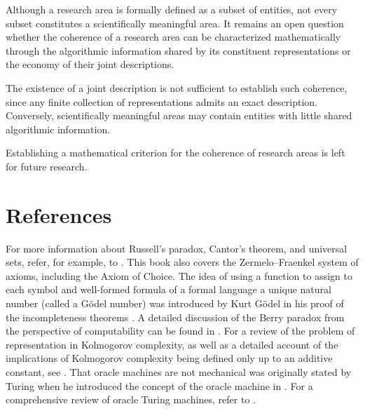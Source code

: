 \begin{remark}
Although a research area is formally defined as a subset of entities, not every subset constitutes a scientifically meaningful area. It remains an open question whether the coherence of a research area can be characterized mathematically through the algorithmic information shared by its constituent representations or the economy of their joint descriptions.

The existence of a joint description is not sufficient to establish such coherence, since any finite collection of representations admits an exact description. Conversely, scientifically meaningful areas may contain entities with little shared algorithmic information.

Establishing a mathematical criterion for the coherence of research areas is left for future research.
\end{remark}

%
%

\section*{References}

For more information about Russell's paradox, Cantor's theorem, and universal sets, refer, for example, to \cite{jech2013set}. This book also covers the Zermelo–Fraenkel system of axioms, including the Axiom of Choice. The idea of using a function to assign to each symbol and well-formed formula of a formal language a unique natural number (called a Gödel number) was introduced by Kurt Gödel in his proof of the incompleteness theorems \cite{godel1931formal}. A detailed discussion of the Berry paradox from the perspective of computability can be found in \cite{chaitin1995berry}. For a review of the problem of representation in Kolmogorov complexity, as well as a detailed account of the implications of Kolmogorov complexity being defined only up to an additive constant, see \cite{li2013introduction}. That oracle machines are not mechanical was originally stated by Turing when he introduced the concept of the oracle machine in \cite{turing1939systems}. For a comprehensive review of oracle Turing machines, refer to \cite{robivc2015foundations}.
